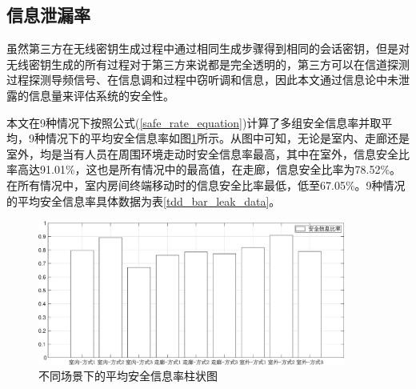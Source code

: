 \documentclass[master]{seuthesis} %
\begin{document}
\begin{Main}
\subsection{信息泄漏率}

虽然第三方在无线密钥生成过程中通过相同生成步骤得到相同的会话密钥，但是对无线密钥生成的所有过程对于第三方来说都是完全透明的\cite{sahin2016secure}，第三方可以在信道探测过程探测导频信号、在信息调和过程中窃听调和信息，因此本文通过信息论中未泄露的信息量来评估系统的安全性。

本文在9种情况下按照公式(\ref{safe_rate_equation})计算了多组安全信息率并取平均，9种情况下的平均安全信息率如图\ref{tdd_bar_leak}所示。从图中可知，无论是室内、走廊还是室外，均是当有人员在周围环境走动时安全信息率最高，其中在室外，信息安全比率高达91.01\%，这也是所有情况中的最高值，在走廊，信息安全比率为78.52\%。在所有情况中，室内房间终端移动时的信息安全比率最低，低至67.05\%。9种情况的平均安全信息率具体数据为表\ref{tdd_bar_leak_data}。


\begin{figure}[htbp!]
    \centering \includegraphics[width=0.9\textwidth]{images/tdd-leak/bar.eps}
    \caption{不同场景下的平均安全信息率柱状图}
    \label{tdd_bar_leak}
\end{figure}



\end{Main}
\end{document}
